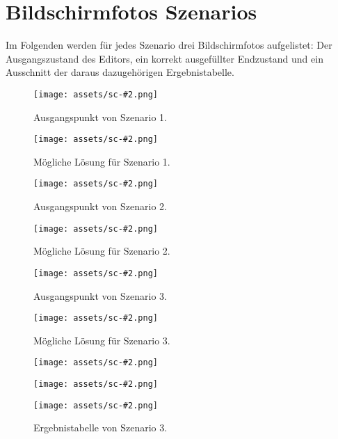\chapter{Bildschirmfotos Szenarios}
\label{app:scenarios}

Im Folgenden werden für jedes Szenario drei Bildschirmfotos aufgelistet: Der Ausgangszustand des Editors, ein korrekt ausgefüllter Endzustand und ein Ausschnitt der daraus dazugehörigen Ergebnistabelle.

\newcommand{\scgraphic}[3][]{%
  \texttt{[image: assets/sc-\#2.png]}
  #1
  \caption{#3}}

\newcommand{\cscgraphic}[2]{%
  \scgraphic[\vspace{-10mm}]{#1}{#2}}

\newcommand{\scfigure}[2]{%
  \begin{figure}[hbtp]
    \centering
    \scgraphic{#1}{#2}
  \end{figure}}

\scfigure{1-start}{Ausgangspunkt von Szenario 1.}
\scfigure{1-end}{Mögliche Lösung für Szenario 1.}
\scfigure{2-start}{Ausgangspunkt von Szenario 2.}
\scfigure{2-end}{Mögliche Lösung für Szenario 2.}
\scfigure{3-start}{Ausgangspunkt von Szenario 3.}
\scfigure{3-end}{Mögliche Lösung für Szenario 3.}
\begin{figure}[hbtp]
  \centering
  \cscgraphic{1-result}{Ergebnistabelle von Szenario 1.}
  \vspace{4mm}
  \cscgraphic{2-result}{Ergebnistabelle von Szenario 2.}
  \vspace{4mm}
  \cscgraphic{3-result}{Ergebnistabelle von Szenario 3.}
\end{figure}
